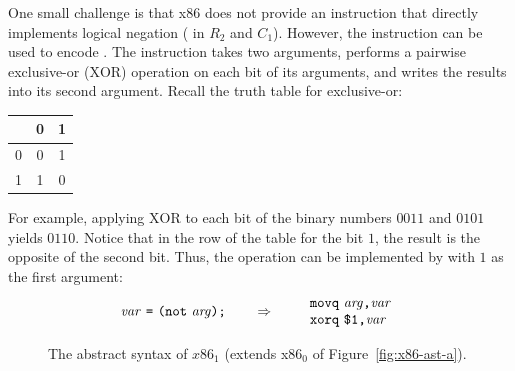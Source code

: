 \documentclass[11pt]{book}
\newcommand{\gray}[1]{{\color{lightgray} #1}}
\begin{document}
One small challenge is that x86 does not provide an instruction that
directly implements logical negation ( in $R_2$ and $C_1$).
However, the  instruction can be used to encode .
The  instruction takes two arguments, performs a pairwise
exclusive-or ($\mathrm{XOR}$) operation on each bit of its arguments,
and writes the results into its second argument.  Recall the truth
table for exclusive-or:
\begin{center}
\begin{tabular}{l|cc}
   & 0 & 1 \\ \hline
0  & 0 & 1 \\
1  & 1 & 0
\end{tabular}
\end{center}
For example, applying $\mathrm{XOR}$ to each bit of the binary numbers
$0011$ and $0101$ yields $0110$. Notice that in the row of the table
for the bit $1$, the result is the opposite of the second bit.  Thus,
the  operation can be implemented by  with $1$ as
the first argument:
\[
\mathit{var}~ \texttt{=}~ \texttt{(}\texttt{not}~\mathit{arg}\texttt{)}\texttt{;}
\qquad\Rightarrow\qquad
\begin{array}{l}
\texttt{movq}~ \mathit{arg}\texttt{,} \mathit{var}\\
\texttt{xorq}~ \texttt{\$1,} \mathit{var}
\end{array}
\]

\begin{figure}[tp]
\fbox{
\begin{minipage}{0.96\textwidth}
\small    
\[
\begin{array}{lcl}
\Arg &::=&  \gray{\IMM{\Int} \mid \REG{\code{'}\Reg} \mid \DEREF{\Reg}{\Int}} 
     \mid \BYTEREG{\code{'}\Reg} \\
\itm{cc} & ::= & \key{e} \mid \key{l} \mid \key{le} \mid \key{g} \mid \key{ge} \\
\Instr &::=& \gray{ \BININSTR{\code{'addq}}{\Arg}{\Arg} 
       \mid \BININSTR{\code{'subq}}{\Arg}{\Arg} } \\
       &\mid& \gray{ \BININSTR{\code{'movq}}{\Arg}{\Arg} 
       \mid \UNIINSTR{\code{'negq}}{\Arg} } \\
       &\mid& \gray{ \CALLQ{\itm{label}} \mid \RETQ{} 
       \mid \PUSHQ{\Arg} \mid \POPQ{\Arg} } \\
       &\mid& \BININSTR{\code{'xorq}}{\Arg}{\Arg}
       \mid \BININSTR{\code{'cmpq}}{\Arg}{\Arg}\\
       &\mid& \BININSTR{\code{'set}}{\code{'}\itm{cc}}{\Arg} 
       \mid \BININSTR{\code{'movzbq}}{\Arg}{\Arg}\\
       &\mid&  \JMP{\itm{label}}
       \mid \JMPIF{\code{'}\itm{cc}}{\itm{label}} \\
\Block &::= & \gray{\BLOCK{\itm{info}}{\Instr^{+}}} \\
x86_1 &::= & \gray{\PROGRAM{\itm{info}}{\CFG{\key{(}\itm{label} \,\key{.}\, \Block \key{)}^{+}}}}
\end{array}
\]
\end{minipage}
}
\caption{The abstract syntax of $x86_1$ (extends x86$_0$ of Figure~\ref{fig:x86-ast-a}).}
\label{fig:x86-1}
\end{figure}
\end{document}
